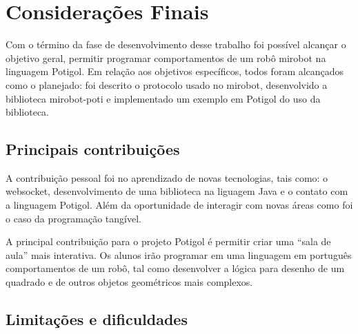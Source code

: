 \chapter{Considerações Finais}
\label{cap:consideracoes}



Com o término da fase de desenvolvimento desse trabalho foi possível alcançar o
objetivo geral, permitir programar comportamentos de
um robô mirobot na linguagem Potigol. 
Em relação aos objetivos específicos, todos foram
alcançados como o planejado: foi descrito o protocolo usado no mirobot,
desenvolvido a biblioteca mirobot-poti e implementado um exemplo em Potigol do
uso da biblioteca.


\section{Principais contribuições}

A contribuição pessoal foi no aprendizado de novas tecnologias, tais como: o websocket, desenvolvimento de uma biblioteca na liguagem Java e o contato com a linguagem Potigol. Além da oportunidade de interagir com novas áreas como foi o caso da programação tangível. 

A principal contribuição para o projeto Potigol é permitir criar uma ``sala de aula'' mais interativa.
Os alunos irão programar em uma linguagem em português comportamentos de um robô, tal como desenvolver a lógica para desenho de um quadrado e de outros objetos geométricos mais complexos.

\section{Limitações e dificuldades}

